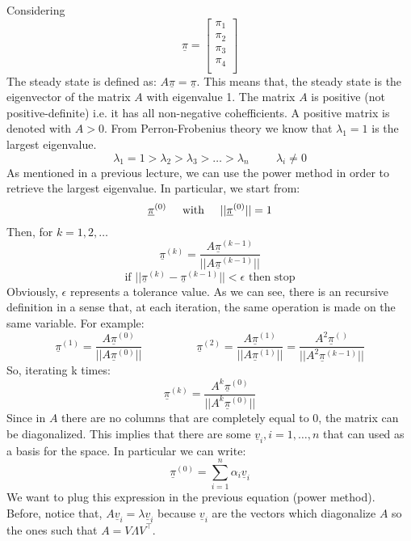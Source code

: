 Considering 
\[
\underline{\pi} = \begin{bmatrix}
    \pi_1\\
    \pi_2\\
    \pi_3\\
    \pi_4\\
\end{bmatrix}    
\]
The steady state is defined as: $A\underline{\pi} = \underline{\pi}$.
This means that, the steady state is the eigenvector of the matrix $A$ with eigenvalue 1. The matrix $A$ is positive (not positive-definite) i.e. it has all non-negative cohefficients. A positive matrix is denoted with $A > 0$.
From Perron-Frobenius theory we know that $\lambda_1 = 1$ is the largest eigenvalue.
\[
    \lambda_1 = 1 > \lambda_2 > \lambda_3 > \dots > \lambda_n \hspace{1cm} \lambda_i \neq 0
\] 
As mentioned in a previous lecture, we can use the power method in order to retrieve the largest eigenvalue. In particular, we start from:
\[
    \underline{\pi}^{(0)} \hspace{0.5cm}\text{with}\hspace{0.5cm} ||\underline{\pi}^{(0)}||=1    
\]
Then, for $k = 1, 2, \dots $
\[
    \underline{\pi}^{(k)} = \dfrac{A\underline{\pi}^{(k-1)}}{||A\underline{\pi}^{(k-1)}||}    
\]
\[
    \text{if } ||\underline{\pi}^{(k)} - \underline{\pi}^{(k-1)}|| < \epsilon \text{ then stop}    
\]
Obviously, $\epsilon$ represents a tolerance value. As we can see, there is an recursive definition in a sense that, at each iteration, the same operation is made on the same variable. For example:
\[
    \underline{\pi}^{(1)} = \dfrac{A\underline{\pi}^{(0)}}{||A\underline{\pi}^{(0)}||}    
    \hspace{2cm}
    \underline{\pi}^{(2)} = \dfrac{A\underline{\pi}^{(1)}}{||A\underline{\pi}^{(1)}||} = \dfrac{A^2\underline{\pi}^{()}}{||A^2\underline{\pi}^{(k-1)}||} 
\]
So, iterating k times:
\[
    \underline{\pi}^{(k)} = \dfrac{A^k\underline{\pi}^{(0)}}{||A^k\underline{\pi}^{(0)}||}     
\]
Since in $A$ there are no columns that are completely equal to 0, the matrix can be diagonalized. This implies that there are some $\underline{v}_i, i = 1, \dots, n$ that can used as a basis for the space. In particular we can write:
\[
    \underline{\pi}^{(0)} = \sum_{i=1}^n \alpha_i \underline{v}_i
\]
We want to plug this expression in the previous equation (power method). Before, notice that, $A\underline{v}_i = \lambda \underline{v}_i$ because $\underline{v}_i$ are the vectors which diagonalize $A$ so the ones such that $A = V\Lambda V^\intercal$. 
